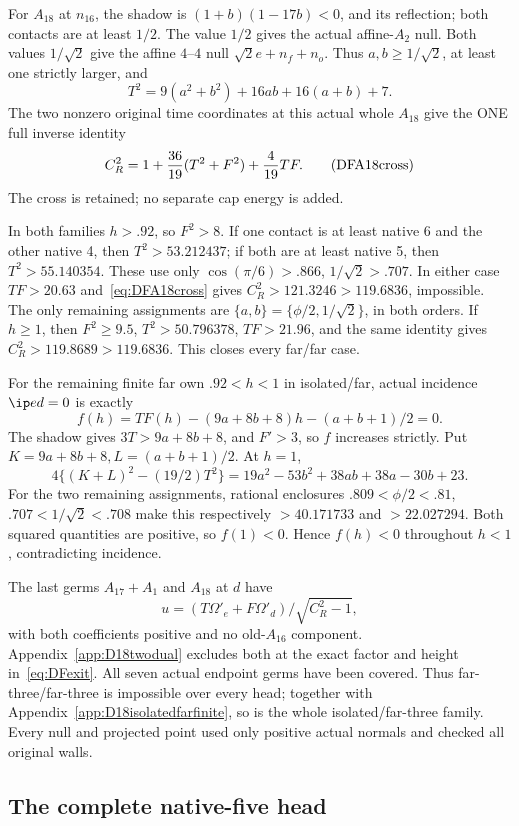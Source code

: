 For \(A_{18}\) at \(n_{16}\), the shadow is
\((1+b)(1-17b)<0\), and its reflection; both contacts are
at least \(1/2\).
The value \(1/2\) gives the actual affine-\(A_2\) null.
Both values \(1/\sqrt2\) give the affine \(4\)--\(4\) null
\(\sqrt2e+n_f+n_o\).
Thus \(a,b\ge1/\sqrt2\), at least one strictly larger, and
\[
 T^2=9(a^2+b^2)+16ab+16(a+b)+7.
\]
The two nonzero original time coordinates at this actual
whole \(A_{18}\) give the ONE full inverse identity
\[
 C_R^2=1+{36\over19}(T^2+F^2)+{4\over19}TF .
\tag{DFA18cross}\label{eq:DFA18cross}
\]
The cross is retained; no separate cap energy is added.

In both families \(h>.92\), so \(F^2>8\).
If one contact is at least native 6 and the other native 4,
then \(T^2>53.212437\); if both are at least native 5,
then \(T^2>55.140354\).
These use only \(\cos(\pi/6)>.866\), \(1/\sqrt2>.707\).
In either case \(TF>20.63\) and~\eqref{eq:DFA18cross}
gives \(C_R^2>121.3246>119.6836\), impossible.
The only remaining assignments are
\(\{a,b\}=\{\phi/2,1/\sqrt2\}\), in both orders.
If \(h\ge1\), then \(F^2\ge9.5\), \(T^2>50.796378\),
\(TF>21.96\), and the same identity gives
\(C_R^2>119.8689>119.6836\).
This closes every far/far case.

For the remaining finite far own \(.92<h<1\) in isolated/far,
actual incidence \(\ip ed=0\) is exactly
\[
 f(h)=TF(h)-(9a+8b+8)h-(a+b+1)/2=0.
\]
The shadow gives \(3T>9a+8b+8\), and \(F'>3\), so \(f\)
increases strictly.
Put \(K=9a+8b+8,L=(a+b+1)/2\).
At \(h=1\),
\[
 4\{(K+L)^2-(19/2)T^2\}
   =19a^2-53b^2+38ab+38a-30b+23.
\]
For the two remaining assignments, rational enclosures
\(.809<\phi/2<.81\), \(.707<1/\sqrt2<.708\) make this
respectively \(>40.171733\) and \(>22.027294\).
Both squared quantities are positive, so \(f(1)<0\).
Hence \(f(h)<0\) throughout \(h<1\), contradicting incidence.

The last germs \(A_{17}+A_1\) and \(A_{18}\) at \(d\) have
\[
 u=(T\Omega'_e+F\Omega'_d)/\sqrt{C_R^2-1},
\]
with both coefficients positive and no old-\(A_{16}\) component.
Appendix~\ref{app:D18twodual} excludes both at the exact
factor and height in~\eqref{eq:DFexit}.
All seven actual endpoint germs have been covered.
Thus far-three/far-three is impossible over every head;
together with Appendix~\ref{app:D18isolatedfarfinite},
so is the whole isolated/far-three family.
Every null and projected point used only positive actual normals
and checked all original walls.

\subsection{The complete native-five head}
\label{app:D18nativefive}

